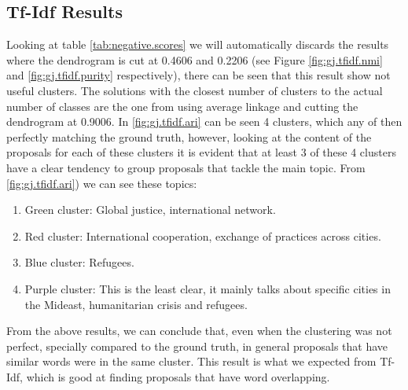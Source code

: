 \subsection{Tf-Idf Results}
Looking at table \ref{tab:negative.scores} we will automatically discards the results where the dendrogram is cut at 0.4606 and 0.2206 (see Figure \ref{fig:gj.tfidf.nmi} and \ref{fig:gj.tfidf.purity} respectively), there can be seen that this result show not useful clusters. The solutions with the closest number of clusters to the actual number of classes are the one from using average linkage and cutting the dendrogram at 0.9006. In \ref{fig:gj.tfidf.ari} can be seen 4 clusters, which any of then perfectly matching the ground truth, however, looking at the content of the proposals for each of these clusters it is evident that at least 3 of these 4 clusters have a clear tendency to group proposals that tackle the main topic. From \ref{fig:gj.tfidf.ari}) we can see these topics:
\begin{enumerate}[itemsep=1pt,parsep=1pt]
\item Green cluster: Global justice, international network.
\item Red cluster: International cooperation, exchange of practices across cities.
\item Blue cluster: Refugees.
\item Purple cluster: This is the least clear, it mainly talks about specific cities in the Mideast, humanitarian crisis and refugees.
\end{enumerate}
From the above results, we can conclude that, even when the clustering was not perfect, specially compared to the ground truth, in general proposals that have similar words were in the same cluster. This result is what we expected from Tf-Idf, which is good at finding proposals that have word overlapping.

